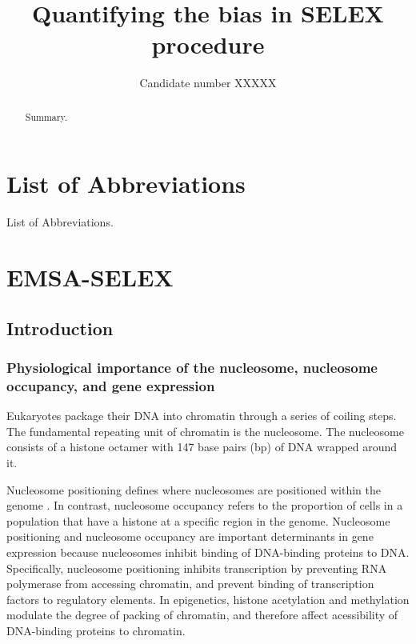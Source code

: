 \documentclass[parskip=full, numbers=noenddot]{scrreprt}
\title{Quantifying the bias in SELEX procedure}
\author{Candidate number XXXXX}
\begin{document}
\maketitle

\begin{abstract}
 
Summary.
 
\end{abstract}

\tableofcontents

\chapter*{List of Abbreviations}
\label{ch:abbrev}

List of Abbreviations.

\chapter{EMSA-SELEX}
\label{ch:emsaselex}

\section{Introduction}
\label{sec:emsaselex_intro}

\subsection{Physiological importance of the nucleosome, nucleosome occupancy, and gene expression}
\label{ssec:emsaselex_intro_importance}

Eukaryotes package their DNA into chromatin through a series of coiling steps.  The fundamental repeating unit of chromatin is the nucleosome.  The nucleosome consists of a histone octamer with 147 base pairs (bp) of DNA wrapped around it.

Nucleosome positioning defines where nucleosomes are positioned within the genome \citep{struhl_determinants_2013}.  In contrast, nucleosome occupancy refers to the proportion of cells in a population that have a histone at a specific region in the genome. Nucleosome positioning and nucleosome occupancy are important determinants in gene expression because nucleosomes inhibit binding of DNA-binding proteins to DNA.  Specifically, nucleosome positioning inhibits transcription by preventing RNA polymerase from accessing chromatin, and prevent binding of transcription factors to regulatory elements.  In epigenetics, histone acetylation and methylation modulate the degree of packing of chromatin, and therefore affect acessibility of DNA-binding proteins to chromatin.
\end{document}
